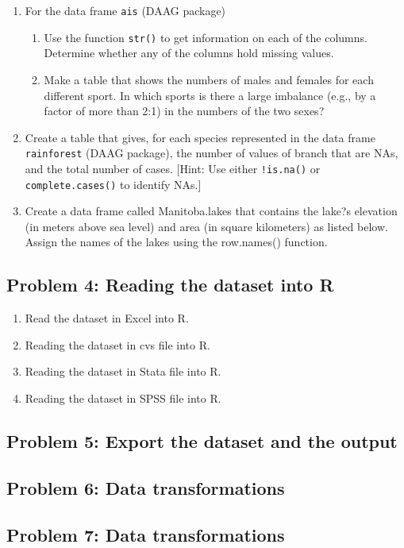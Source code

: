 \documentclass[11pt,a4paper]{article}
\begin{document}
\begin{enumerate}
	 \item For the data frame \texttt{ais} (DAAG package)
	 \begin{enumerate}
	 	\item Use the function \texttt{str()} to get information on each of the columns. Determine whether any of the columns hold missing values.
	 	\item Make a table that shows the numbers of males and females for each different sport. In which sports is there a large imbalance (e.g., by a factor of more than 2:1) in the numbers of the two sexes?
	 \end{enumerate}
	 
	 \item Create a table that gives, for each species represented in the data frame \texttt{rainforest} (DAAG package), the number of values of branch that are NAs, and the total number of cases.
	 [Hint: Use either \texttt{!is.na()} or \texttt{complete.cases()} to identify NAs.]
	 
	 \item Create a data frame called Manitoba.lakes that contains the lake?s elevation (in meters
	 above sea level) and area (in square kilometers) as listed below. Assign the names of the lakes
	 using the row.names() function.
\end{enumerate}


\subsection*{Problem 4: Reading the dataset into R}
\begin{enumerate}
	\item Read the dataset in Excel into R. 
	\item Reading the dataset in cvs file into R. 
	\item Reading the dataset in Stata file into R. 
	\item Reading the dataset in SPSS file into R. 
	
\end{enumerate}


\subsection*{Problem 5: Export the dataset and the output}


\subsection*{Problem 6: Data transformations}


\subsection*{Problem 7: Data transformations}
\end{document}
